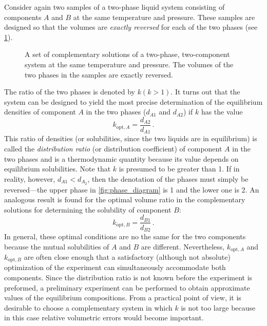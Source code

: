 Consider again two samples of a two-phase liquid system consisting of components \(A\) and \(B\) at the same temperature and pressure. 
These samples are designed so that the volumes are \emph{exactly reversed} for each of the two phases (see \cref{fig:two_samples_b}). 
\begin{figure}
	\caption{A set of complementary solutions of a two-phase, two-component system at the same temperature and pressure. The volumes of the two phases in the samples are exactly reversed.}
	\label{fig:two_samples_b}
\end{figure}
The ratio of the two phases is denoted by \(k (k>1)\). 
It turns out that the system can be designed to yield the most precise determination of the equilibrium densities  of component \(A\) in the two phases (\(d_{A1}\) and \(d_{A2}\)) if \(k\) has the value 
\begin{equation}
	k_{\text{opt},A} = \frac{d_{A2}}{d_{A1}} \, .
	\label{eq:optimal_ratio_a}
\end{equation}
This ratio of densities (or solubilities, since the two liquids are in equilibrium) is called the \emph{distribution ratio} (or distribution coefficient) of component \(A\) in the two phases and is a thermodynamic quantity because its value depends on equilibrium solubilities. 
Note that \(k\) is presumed to be greater than \num{1}. 
If in reality, however, \(d_{A1} < d_{A_2}\), then the denotation of the phases must simply be reversed---the upper phase in \cref{fig:phase_diagram} is \num{1} and the lower one is \num{2}. 
An analogous result is found for the optimal volume ratio in the complementary solutions for determining the solubility of component \(B\):
\begin{equation}
	k_{\text{opt},B} = \frac{d_{B1}}{d_{B2}} \, .
	\label{eq:optimal_ratio_b}
\end{equation}
In general, these optimal conditions are no the same for the two components because the mutual solubilities of \(A\) and \(B\) are different. 
Nevertheless, \(k_{\text{opt},A}\) and \(k_{\text{opt},B}\) are often close enough that a satisfactory (although not absolute) optimization of the experiment can simultaneously accommodate both components. 
Since the distribution ratio is not known before the experiment is preformed, a preliminary experiment can be performed to obtain approximate values of the equilibrium compositions. 
From a practical point of view, it is desirable to choose a complementary system in which \(k\) is not too large because in this case relative volumetric errors would become important. 

